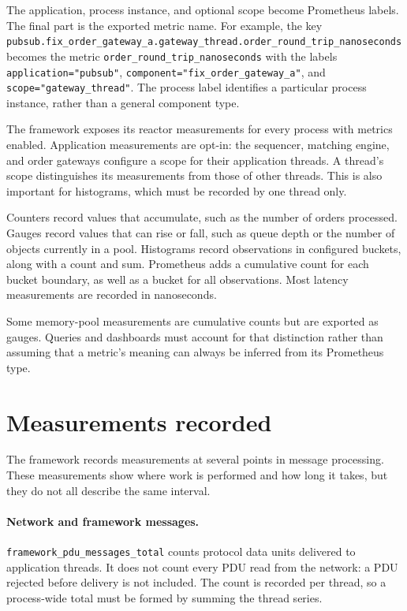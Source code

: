The application, process instance, and optional scope become Prometheus labels. The final
part is the exported metric name. For example, the key
\texttt{pubsub.fix\_order\_gateway\_a.gateway\_thread.order\_round\_trip\_nanoseconds}
becomes the metric \texttt{order\_round\_trip\_nanoseconds} with the labels
\texttt{application="pubsub"}, \texttt{component="fix\_order\_gateway\_a"}, and
\texttt{scope="gateway\_thread"}. The process label identifies a particular process
instance, rather than a general component type.

The framework exposes its reactor measurements for every process with metrics enabled.
Application measurements are opt-in: the sequencer, matching engine, and order gateways
configure a scope for their application threads. A thread's scope distinguishes its
measurements from those of other threads. This is also important for histograms, which
must be recorded by one thread only.

Counters record values that accumulate, such as the number of orders processed. Gauges
record values that can rise or fall, such as queue depth or the number of objects currently
in a pool. Histograms record observations in configured buckets, along with a count and
sum. Prometheus adds a cumulative count for each bucket boundary, as well as a bucket for
all observations. Most latency measurements are recorded in nanoseconds.

Some memory-pool measurements are cumulative counts but are exported as gauges. Queries
and dashboards must account for that distinction rather than assuming that a metric's
meaning can always be inferred from its Prometheus type.

\section{Measurements recorded}

The framework records measurements at several points in message processing. These
measurements show where work is performed and how long it takes, but they do not all
describe the same interval.

\paragraph{Network and framework messages.}
\texttt{framework\_pdu\_messages\_total} counts protocol data units delivered to
application threads. It does not count every PDU read from the network: a PDU rejected
before delivery is not included. The count is recorded per thread, so a process-wide
total must be formed by summing the thread series.

